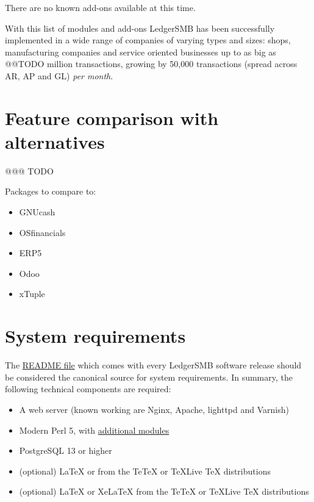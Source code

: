 There are no known \glspl{add-on} available at this time.

With this list of modules and \glspl{add-on} LedgerSMB has been successfully
implemented in a wide range of companies of varying types and sizes: shops,
manufacturing companies and service oriented businesses up to as big as @@TODO million transactions, growing by 50,000 transactions (spread across \acrshort{AR}, \acrshort{AP} and \acrshort{GL}) \emph{per month}.

\section{Feature comparison with alternatives}
\label{sec-ledgersmb-feature-comparison}
@@@ TODO

Packages to compare to:

\begin{itemize}
	\item GNUcash
	\item OSfinancials
	\item ERP5
	\item Odoo
	\item xTuple
\end{itemize}



\section{System requirements}
\label{sec-ledgersmb-system-requirements}

The \href{https://github.com/ledgersmb/LedgerSMB/blob/1.10/README.md#system-requirements}{README file}
which comes with every LedgerSMB software release should be
considered the canonical source for system requirements. In summary, the
following technical components are required:

\begin{itemize}
	\item A web server (known working are Nginx, Apache, lighttpd and Varnish)
	\item Modern Perl 5, with \href{https://github.com/ledgersmb/LedgerSMB/blob/1.10/cpanfile}{additional modules}
	\item PostgreSQL 13 or higher
    \ifpdf
	   \item (optional) \LaTeX{} or \XeLaTeX{} from the Te\TeX{} or \TeX{}Live \TeX{} distributions
    \else
    	\item (optional) LaTeX or XeLaTeX from the TeTeX or TeXLive TeX distributions
    \fi
    
\end{itemize}

